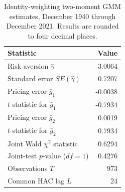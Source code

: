 \begin{table}[!htbp]
  \centering
  \caption{Identity-weighting two-moment GMM estimates, December 1940
  through December 2021. Results are rounded to four decimal places.}
  \label{tab:q3c-gmm-summary}
  \small
  \begin{tabular}{lr}
    \toprule
    Statistic & Value \\
    \midrule
    Risk aversion $\hat\gamma$ & 3.0064 \\
    Standard error $SE(\hat\gamma)$ & 0.7207 \\
    Pricing error $\bar g_1$ & -0.0038 \\
    $t$-statistic for $\bar g_1$ & -0.7934 \\
    Pricing error $\bar g_2$ & 0.0019 \\
    $t$-statistic for $\bar g_2$ & 0.7934 \\
    Joint Wald $\chi^2$ statistic & 0.6294 \\
    Joint-test $p$-value ($df=1$) & 0.4276 \\
    Observations $T$ & 973 \\
    Common HAC lag $L$ & 24 \\
    \bottomrule
  \end{tabular}
\end{table}
